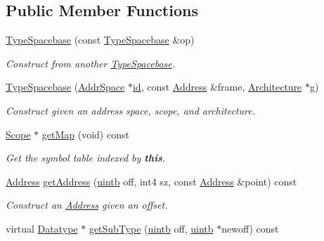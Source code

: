 \subsection*{Public Member Functions}
\begin{DoxyCompactItemize}
\item 
\mbox{\hyperlink{class_type_spacebase_a6ed0488bb11f4727eeb8dfff2641a095}{Type\+Spacebase}} (const \mbox{\hyperlink{class_type_spacebase}{Type\+Spacebase}} \&op)
\begin{DoxyCompactList}\small\item\em Construct from another \mbox{\hyperlink{class_type_spacebase}{Type\+Spacebase}}. \end{DoxyCompactList}\item 
\mbox{\hyperlink{class_type_spacebase_ac02a63941816db70d4ded48f26623afa}{Type\+Spacebase}} (\mbox{\hyperlink{class_addr_space}{Addr\+Space}} $\ast$\mbox{\hyperlink{class_datatype_ac2bb702c6067fae98d7c0257e928d5a1}{id}}, const \mbox{\hyperlink{class_address}{Address}} \&frame, \mbox{\hyperlink{class_architecture}{Architecture}} $\ast$g)
\begin{DoxyCompactList}\small\item\em Construct given an address space, scope, and architecture. \end{DoxyCompactList}\item 
\mbox{\hyperlink{class_scope}{Scope}} $\ast$ \mbox{\hyperlink{class_type_spacebase_acd0c089f2ffe851a5f10e1c63caba40c}{get\+Map}} (void) const
\begin{DoxyCompactList}\small\item\em Get the symbol table indexed by {\bfseries{this}}. \end{DoxyCompactList}\item 
\mbox{\hyperlink{class_address}{Address}} \mbox{\hyperlink{class_type_spacebase_a06a6a2b993228d5619dd00ed65ebac16}{get\+Address}} (\mbox{\hyperlink{types_8h_a2db313c5d32a12b01d26ac9b3bca178f}{uintb}} off, int4 sz, const \mbox{\hyperlink{class_address}{Address}} \&point) const
\begin{DoxyCompactList}\small\item\em Construct an \mbox{\hyperlink{class_address}{Address}} given an offset. \end{DoxyCompactList}\item 
virtual \mbox{\hyperlink{class_datatype}{Datatype}} $\ast$ \mbox{\hyperlink{class_type_spacebase_a0dc2b2f9eadee2b8c79e2403a9c908fe}{get\+Sub\+Type}} (\mbox{\hyperlink{types_8h_a2db313c5d32a12b01d26ac9b3bca178f}{uintb}} off, \mbox{\hyperlink{types_8h_a2db313c5d32a12b01d26ac9b3bca178f}{uintb}} $\ast$newoff) const

\end{DoxyCompactItemize}
